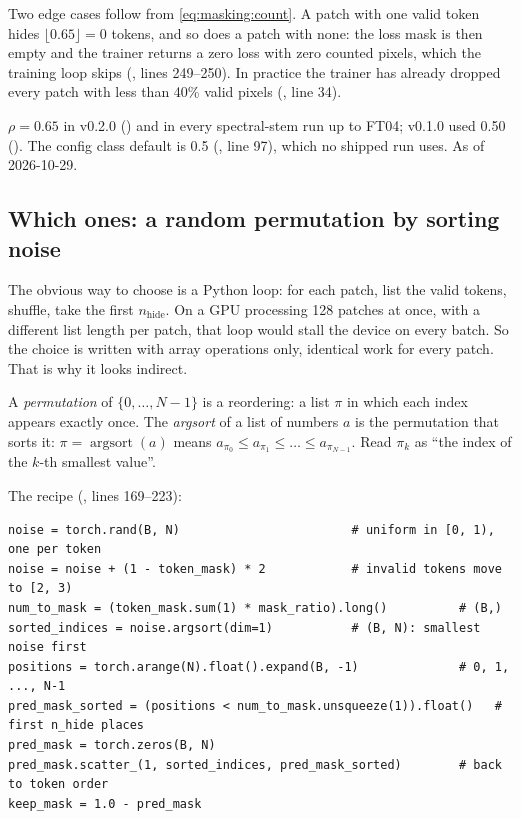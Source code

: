 Two edge cases follow from \cref{eq:masking:count}. A patch with one valid token hides
$\lfloor 0.65 \rfloor = 0$ tokens, and so does a patch with none: the loss mask is then empty and the
trainer returns a zero loss with zero counted pixels, which the training loop skips
(, lines 249--250). In practice the trainer has already
dropped every patch with less than 40\% valid pixels (, line 34).

\begin{drift}
$\rho = 0.65$ in v0.2.0 () and in every spectral-stem
run up to FT04; v0.1.0
used 0.50 (). The config class default is 0.5
(, line 97), which no shipped run uses. As of 2026-10-29.
\end{drift}

\subsection{Which ones: a random permutation by sorting noise}

The obvious way to choose is a Python loop: for each patch, list the valid tokens, shuffle, take the
first $n_{\text{hide}}$. On a GPU processing 128 patches at once, with a different list length per
patch, that loop would stall the device on every batch. So the choice is written with array
operations only, identical work for every patch. That is why it looks indirect.

\begin{definition}
A \emph{permutation} of $\{0, \dots, N-1\}$ is a reordering: a list $\pi$ in which
each index appears exactly once. The \emph{argsort} of a list of numbers $a$ is the
permutation that sorts it: $\pi = \operatorname{argsort}(a)$ means $a_{\pi_0} \le a_{\pi_1} \le \dots
\le a_{\pi_{N-1}}$. Read $\pi_k$ as ``the index of the $k$-th smallest value''.
\end{definition}

The recipe (, lines 169--223):
\begin{lstlisting}
noise = torch.rand(B, N)                        # uniform in [0, 1), one per token
noise = noise + (1 - token_mask) * 2            # invalid tokens move to [2, 3)
num_to_mask = (token_mask.sum(1) * mask_ratio).long()          # (B,)
sorted_indices = noise.argsort(dim=1)           # (B, N): smallest noise first
positions = torch.arange(N).float().expand(B, -1)              # 0, 1, ..., N-1
pred_mask_sorted = (positions < num_to_mask.unsqueeze(1)).float()   # first n_hide places
pred_mask = torch.zeros(B, N)
pred_mask.scatter_(1, sorted_indices, pred_mask_sorted)        # back to token order
keep_mask = 1.0 - pred_mask
\end{lstlisting}

